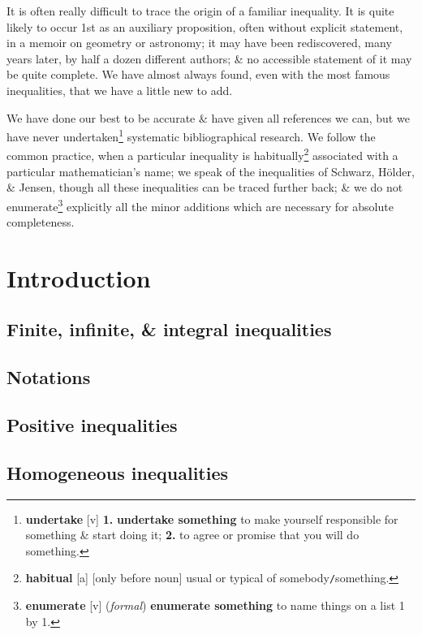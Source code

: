 \documentclass[oneside]{book}
\numberwithin{equation}{section}
\begin{document}
It is often really difficult to trace the origin of a familiar inequality. It is quite likely to occur 1st as an auxiliary proposition, often without explicit statement, in a memoir on geometry or astronomy; it may have been rediscovered, many years later, by half a dozen different authors; \& no accessible statement of it may be quite complete. We have almost always found, even with the most famous inequalities, that we have a little new to add.

We have done our best to be accurate \& have given all references we can, but we have never undertaken\footnote{\textbf{undertake} [v] \textbf{1.} \textbf{undertake something} to make yourself responsible for something \& start doing it; \textbf{2.} to agree or promise that you will do something.} systematic bibliographical research. We follow the common practice, when a particular inequality is habitually\footnote{\textbf{habitual} [a] [only before noun] usual or typical of somebody\texttt{/}something.} associated with a particular mathematician's name; we speak of the inequalities of Schwarz, H\"older, \& Jensen, though all these inequalities can be traced further back; \& we do not enumerate\footnote{\textbf{enumerate} [v] (\textit{formal}) \textbf{enumerate something} to name things on a list 1 by 1.} explicitly all the minor additions which are necessary for absolute completeness.


\section{Introduction}

\subsection{Finite, infinite, \& integral inequalities}

\subsection{Notations}

\subsection{Positive inequalities}

\subsection{Homogeneous inequalities}
\end{document}
